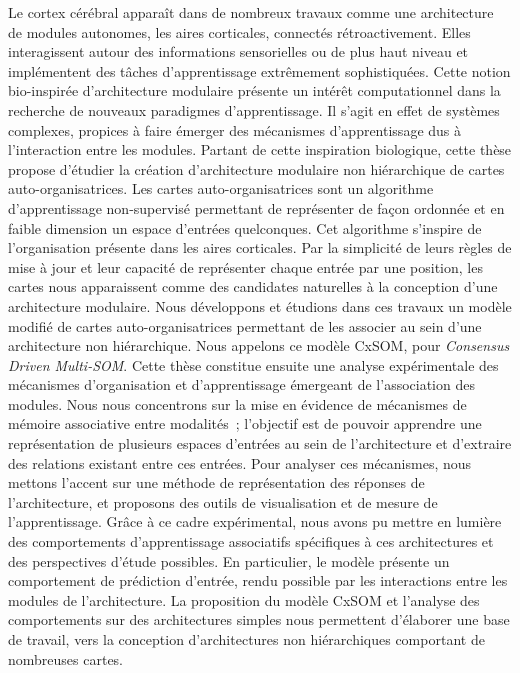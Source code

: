 \documentclass[11pt]{thesul-cs}
\begin{document}
\dominitoc

\begin{ThesisAbstract}
  \begin{FrenchAbstract}
Le cortex cérébral apparaît dans de nombreux travaux comme une architecture de modules autonomes, les aires corticales, connectés rétroactivement. Elles interagissent autour des informations sensorielles ou de plus haut niveau et implémentent des tâches d'apprentissage extrêmement sophistiquées. Cette notion bio-inspirée d'architecture modulaire présente un intérêt computationnel dans la recherche de nouveaux paradigmes d'apprentissage. Il s'agit en effet de systèmes complexes, propices à faire émerger des mécanismes d'apprentissage dus à l'interaction entre les modules.
Partant de cette inspiration biologique, cette thèse propose d'étudier la création d'architecture modulaire non hiérarchique de cartes auto-organisatrices.
Les cartes auto-organisatrices sont un algorithme d'apprentissage non-supervisé permettant de représenter de façon ordonnée et en faible dimension un espace d'entrées quelconques. Cet algorithme s'inspire de l'organisation présente dans les aires corticales. 
Par la simplicité de leurs règles de mise à jour et leur capacité de représenter chaque entrée par une position, les cartes nous apparaissent comme des candidates naturelles à la conception d'une architecture modulaire.
Nous développons et étudions dans ces travaux un modèle modifié de cartes auto-organisatrices permettant de les associer au sein d'une architecture non hiérarchique. Nous appelons ce modèle CxSOM, pour \emph{Consensus Driven Multi-SOM}.
Cette thèse constitue ensuite une analyse expérimentale des mécanismes d'organisation et d'apprentissage émergeant de l'association des modules. Nous nous concentrons sur la mise en évidence de mécanismes de mémoire associative entre modalités~; l'objectif est de pouvoir apprendre une représentation de plusieurs espaces d'entrées au sein de l'architecture et d'extraire des relations existant entre ces entrées.
Pour analyser ces mécanismes, nous mettons l'accent sur une méthode de représentation des réponses de l'architecture, et proposons des outils de visualisation et de mesure de l'apprentissage. Grâce à ce cadre expérimental, nous avons pu mettre en lumière des comportements d'apprentissage associatifs spécifiques à ces architectures et des perspectives d'étude possibles.
En particulier, le modèle présente un comportement de prédiction d'entrée, rendu possible par les interactions entre les modules de l'architecture.
La proposition du modèle CxSOM et l'analyse des comportements sur des architectures simples nous permettent d'élaborer une base de travail, vers la conception d'architectures non hiérarchiques comportant de nombreuses cartes.


\end{FrenchAbstract}
\end{ThesisAbstract}
\end{document}
